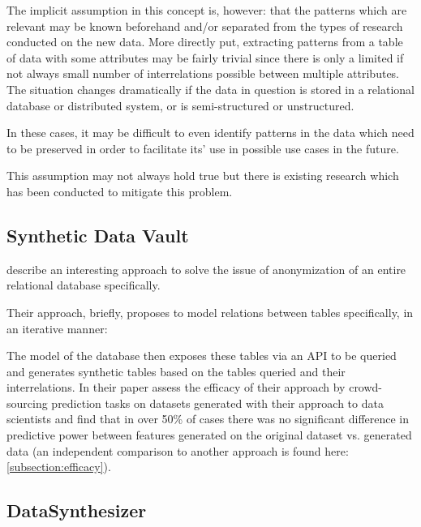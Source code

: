 The implicit assumption in this concept is, however: that the patterns which are relevant may be known beforehand and/or separated from the types of research conducted on the new data. More directly put, extracting patterns from a table of data with some attributes may be fairly trivial since there is only a limited if not always small number of interrelations possible between multiple attributes. 
The situation changes dramatically if the data in question is stored in a relational database or distributed system, or is semi-structured or unstructured.

In these cases, it may be difficult to even identify patterns in the data which need to be preserved in order to facilitate its' use in possible use cases in the future.

This assumption may not always hold true but there is existing research which has been conducted to mitigate this problem.

\pagebreak

\subsection{Synthetic Data Vault}

\cite{patki2016synthetic} describe an interesting approach to solve the issue of anonymization of an entire relational database specifically. 

Their approach, briefly, proposes to model relations between tables specifically, in an iterative manner:


The model of the database then exposes these tables via an \ac{API} to be queried and generates synthetic tables based on the tables queried and their interrelations.
In their paper \cite{patki2016synthetic} assess the efficacy of their approach by crowd-sourcing prediction tasks on datasets generated with their approach to data scientists and find that in over 50\% of cases 
there was no significant difference in predictive power between features generated on the original dataset vs. generated data (an independent comparison to another approach is found here: \ref{subsection:efficacy}).

\pagebreak

\subsection{DataSynthesizer}
\label{subsection:datasynthesizer}

